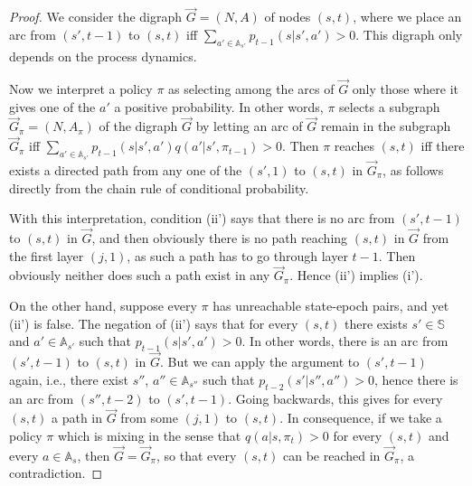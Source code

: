 \documentclass{article}
\theoremstyle{definition}
\numberwithin{equation}{section}
\begin{document}
{\begin{proof}
We consider the digraph $\vec{G}=(N,A)$ of nodes $(s,t)$, where we place an arc from
    $(s',t-1)$ to $(s,t)$ iff $\sum_{a'\in \mathbb{A}_{s'}}p_{t-1}(s|s',a') > 0$. 
    This digraph only depends on the process dynamics. 

    
    Now we interpret a policy $\pi$ as selecting among the arcs of $\vec{G}$ only
    those where it gives one of the $a'$
    a positive probability.
  In other words,  $\pi$ selects a subgraph $\vec{G}_\pi=(N,A_\pi)$ of the digraph $\vec{G}$ by letting an
arc of $\vec{G}$ remain in the subgraph $\vec{G}_\pi$
iff $\sum_{a'\in \mathbb{A}_{s'}} p_{t-1}(s|s',a')q(a'|s',\pi_{t-1}) > 0$.
    Then $\pi$ reaches $(s,t)$ iff there exists a directed path from any one of the $(s',1)$ to $(s,t)$
    in $\vec{G}_\pi$, as follows directly from the chain rule of conditional probability.
    
With this interpretation, condition 
    (ii') says that there is no arc from $(s',t-1)$ to $(s,t)$ in $\vec{G}$, and then obviously there is no path
    reaching $(s,t)$ in $\vec{G}$ from the first layer $(j,1)$, as such a path has to go through layer $t-1$. Then obviously neither does such a path exist in any $\vec{G}_\pi$. 
    Hence (ii') implies (i').


    On the other hand, suppose every $\pi$ has unreachable state-epoch pairs, and yet
    (ii') is false.
    The negation of (ii') says
    that for every $(s,t)$ there exists $s'\in \mathbb{S}$
    and $a' \in \mathbb{A}_{s'}$ such that $p_{t-1}(s|s',a') > 0$. In other words,
    there is an arc from $(s',t-1)$ to $(s,t)$ in $\vec{G}$. But we can apply the argument to
    $(s',t-1)$ again, i.e.,  there exist $s''$, $a''\in \mathbb{A}_{s''}$ such that $p_{t-2}(s'|s'',a'')>0$, 
    hence
    there is an arc from $(s'',t-2)$ to $(s',t-1)$.  Going backwards, 
    this gives for every $(s,t)$ a path in $\vec{G}$ from some $(j,1)$ to $(s,t)$.
    In consequence, if we take
    a policy
    $\pi$ which is mixing in the sense that $q(a|s,\pi_{t}) > 0$ for every
    $(s,t)$ and every $a\in \mathbb{A}_s$, 
then $\vec{G}=\vec{G}_\pi$,
    so that every $(s,t)$ can be reached in $\vec{G}_\pi$, a contradiction.
    \end{proof}



}
\end{document}
